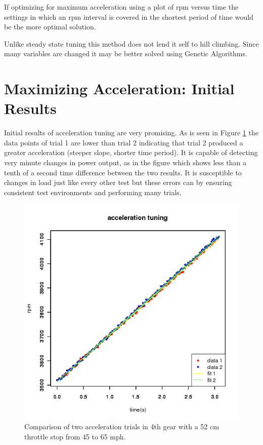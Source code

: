 \documentclass{article}
\begin{document}
If optimizing for maximum acceleration using a plot of rpm versus time
the settings in which an rpm interval is covered in the shortest period
of time would be the more optimal solution.

Unlike steady state tuning this method does not lend it self to hill climbing.
Since many variables are changed it may be better solved using Genetic Algorithms.

\section{Maximizing Acceleration: Initial Results}

Initial results of acceleration tuning are very promising.
As is seen in Figure \ref{fig:atun1} the data points of trial 1 are
lower than trial 2 indicating that trial 2 produced a greater acceleration
(steeper slope, shorter time period).
It is capable of detecting very minute changes in power output,
as in the figure which shows less than a tenth of a second time difference
between the two results.
It is susceptible to changes in load just like every other test but these
errors can by ensuring consistent test environments and performing many trials.

\begin{figure}[!hbt]
\center
\includegraphics[scale=0.6]{msq-accel-4g_52cm_45-65mph-20110624-16:51:49-rtdata-single.png}
\caption{Comparison of two acceleration trials in 4th gear with a 52 cm throttle stop from 45 to 65 mph.}
\label{fig:atun1}
\end{figure}
\end{document}
